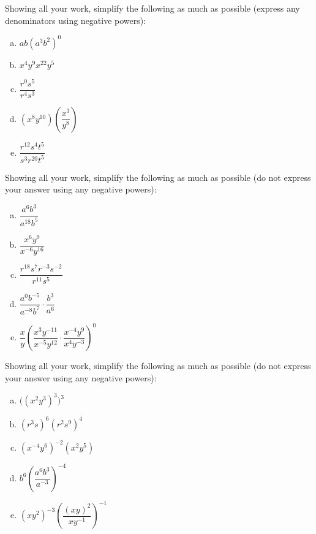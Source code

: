\documentclass[11pt,letterpaper]{article}
\begin{document}

 Showing all your work, simplify the following as much as possible (express any denominators using negative powers):
	\begin{enumerate}[(a)]
	\item $ab(a^3 b^2)^0$
	\item $x^4 y^9 x^{22} y^5$
	\item $\dfrac{r^0 s^5}{r^4 s^3}$
	\item $(x^8 y^{10}) \left( \dfrac{x^3}{y^8} \right)$
	\item $\dfrac{r^{12} s^4 t^5}{s^3 r^{20} t^5}$
	\end{enumerate}



\newpage



 Showing all your work, simplify the following as much as possible (do not express your answer using any negative powers): 
	\begin{enumerate}[(a)]
	\item $\dfrac{a^6 b^3}{a^{18} b^5}$
	\item $\dfrac{x^6 y^9}{x^{-6} y^{16}}$
	\item $\dfrac{r^{18} s^7 r^{-3} s^{-2}}{ r^{11} s^5}$
	\item $\dfrac{a^0 b^{-5}}{a^{-8} b^7} \cdot \dfrac{b^3}{a^6}$
	\item $\dfrac{x}{y} \left( \dfrac{x^3 y^{-11}}{x^{-5} y^{12}} \cdot \dfrac{x^{-4} y^9}{x^4 y^{-3}} \right)^0$
	\end{enumerate}



\newpage



 Showing all your work, simplify the following as much as possible (do not express your answer using any negative powers): 
	\begin{enumerate}[(a)]
	\item $\big( (x^2 y^3)^3 \big)^3$
	\item $(r^3s)^6 (r^2s^9)^4$	
	\item $(x^{-4} y^6)^{-2} (x^2 y^5)$
	\item $b^6 \left( \dfrac{a^6 b^3}{a^{-3}} \right)^{-4}$
	\item $(xy^2)^{-3} \left( \dfrac{(xy)^2}{xy^{-1}} \right)^{-1}$
	\end{enumerate}
\end{document}
